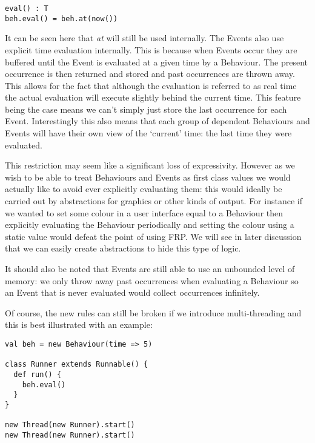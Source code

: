 \begin{verbatim}
eval() : T
beh.eval() = beh.at(now())
\end{verbatim}  

      It can be seen here that \emph{at} will still be used internally. The Events also use explicit time
      evaluation internally. This is because when Events occur they are buffered until the Event is
      evaluated at a given time by a Behaviour. The present occurrence is then returned and stored and past occurrences
      are thrown away. This allows for the fact that although the evaluation is referred to as real time the
      actual evaluation will execute slightly behind the current time. This feature being the
      case means we can't simply just store the last occurrence for each Event. Interestingly this also
      means that each group of dependent Behaviours and Events will have their own view of the `current' time:
      the last time they were evaluated.

      This restriction may seem like a significant loss of expressivity. However as we wish to be able to treat
      Behaviours and Events as first class values we would actually like to avoid ever explicitly evaluating
      them: this would ideally be carried out by abstractions for graphics or other kinds of output. For instance
      if we wanted to set some colour in a user interface equal to a Behaviour then explicitly evaluating the Behaviour
      periodically and setting the colour using a static value would defeat the point of using FRP. We will see in later
      discussion that we can easily create abstractions to hide this type of logic.
      
      It should also be noted that Events are still able to use an unbounded level of memory: we only throw away
      past occurrences when evaluating a Behaviour so an Event that is never evaluated would collect occurrences
      infinitely.
      
      Of course, the new rules can still be broken if we introduce multi-threading and this is best illustrated
      with an example:
      
\begin{verbatim}
val beh = new Behaviour(time => 5)

class Runner extends Runnable() {
  def run() {
    beh.eval()
  }
}

new Thread(new Runner).start()
new Thread(new Runner).start()
\end{verbatim}       

